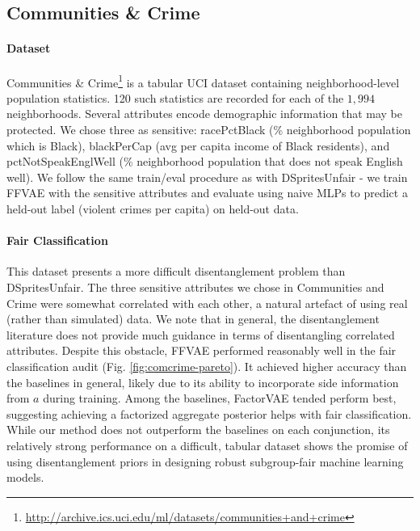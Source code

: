 \subsection{Communities \& Crime} \label{sec:communities}
\paragraph{Dataset}
Communities \& Crime\footnote{\scriptsize \url{http://archive.ics.uci.edu/ml/datasets/communities+and+crime}} is a tabular UCI dataset containing neighborhood-level population statistics. 
120 such statistics are recorded for each of the $1,994$ neighborhoods. 
Several attributes encode demographic information that may be protected. We chose three as sensitive: racePctBlack (\% neighborhood population which is Black), blackPerCap (avg per capita income of Black residents), and pctNotSpeakEnglWell (\% neighborhood population that does not speak English well). 
We follow the same train/eval procedure as with DSpritesUnfair - we train FFVAE with the sensitive attributes and evaluate using naive MLPs to predict a held-out label (violent crimes per capita) on held-out data.



\paragraph{Fair Classification}
This dataset presents a more difficult disentanglement problem than DSpritesUnfair.
The three sensitive attributes we chose in Communities and Crime were somewhat correlated with each other, a natural artefact of using real (rather than simulated) data.
We note that in general, the disentanglement literature does not provide much guidance in terms of disentangling correlated attributes.
Despite this obstacle, FFVAE performed reasonably well in the fair classification audit (Fig. \ref{fig:comcrime-pareto}).
It achieved higher accuracy than the baselines in general, likely due to its ability to incorporate side information from $a$ during training.
Among the baselines, FactorVAE tended perform best, suggesting achieving a factorized aggregate posterior helps with fair classification.
While our method does not outperform the baselines on each conjunction, its relatively strong performance on a difficult, tabular dataset shows the promise of using disentanglement priors in designing robust subgroup-fair machine learning models.


